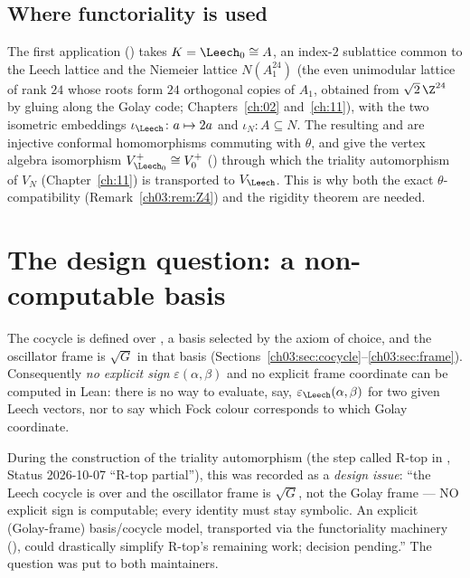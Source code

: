 \subsection{Where functoriality is used}

The first application () takes $K=\Leech_0\cong A$, an
index-$2$ sublattice common to the Leech lattice and the Niemeier lattice $N(A_1^{24})$ (the
even unimodular lattice of rank $24$ whose roots form $24$ orthogonal copies of $A_1$, obtained
from $\sqrt2\,\Z^{24}$ by gluing along the Golay code; Chapters~\ref{ch:02} and~\ref{ch:11}), with the
two isometric embeddings $\iota_\Leech\colon a\mapsto 2a$ and $\iota_N\colon A\subseteq N$. The
resulting  and 
are injective conformal homomorphisms commuting with $\theta$, and give the vertex algebra
isomorphism $V_{\Leech_0}^+\cong V_0^+$ () through which the triality
automorphism of $V_{N}$ (Chapter~\ref{ch:11}) is transported to $V_\Leech$. This is why both the
exact $\theta$-compatibility (Remark~\ref{ch03:rem:Z4}) and the rigidity theorem are needed.

\section{The design question: a non-computable basis}\label{ch03:sec:design}

The cocycle  is defined over , a basis selected
by the axiom of choice, and the oscillator frame is $\sqrt G$ in that basis
(Sections~\ref{ch03:sec:cocycle}--\ref{ch03:sec:frame}). Consequently \emph{no explicit sign}
$\varepsilon(\alpha,\beta)$ and no explicit frame coordinate can be computed in Lean: there is no
way to evaluate, say, $\varepsilon_\Leech(\alpha,\beta)$ for two given Leech vectors, nor to say
which Fock colour corresponds to which Golay coordinate.

During the construction of the triality automorphism (the step called R-top in
, Status 2026-10-07 ``R-top partial''), this was recorded as a
\emph{design issue}: ``the Leech cocycle is  over
 and the oscillator frame is $\sqrt G$, not the Golay frame --- NO
explicit sign is computable; every identity must stay symbolic. An explicit (Golay-frame)
basis/cocycle model, transported via the functoriality machinery (), could
drastically simplify R-top's remaining work; decision pending.'' The question was put to both
maintainers.

